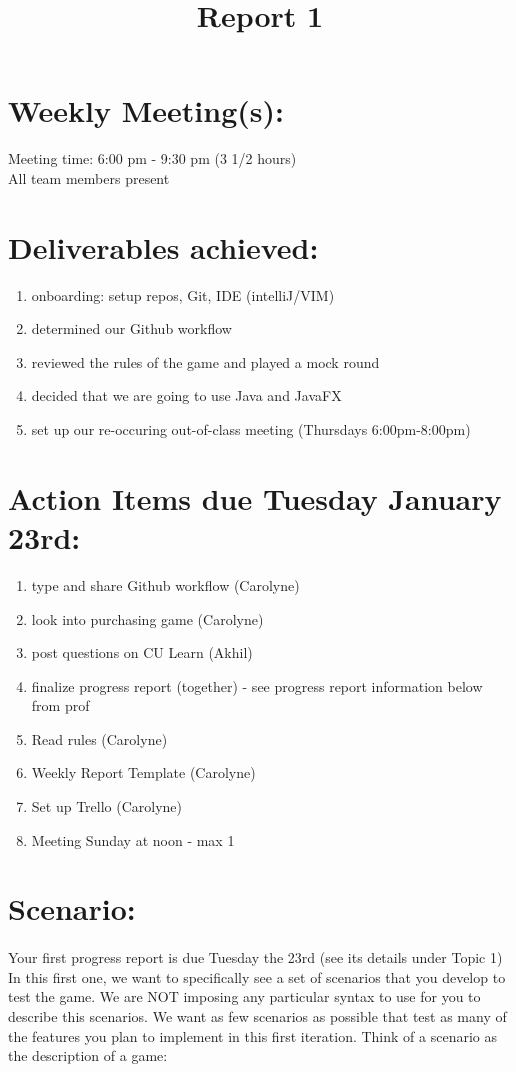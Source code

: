 \documentclass[a4paper,11pt]{report}
\title{Report 1}
\begin{document}
\section{Weekly Meeting(s):}
Meeting time: 6:00 pm - 9:30 pm (3 1/2 hours)\\
All team members present

\section{Deliverables achieved:}
\begin{enumerate}
\item	onboarding: setup repos, Git, IDE (intelliJ/VIM)
\item determined our Github workflow
\item reviewed the rules of the game and played a mock round
\item decided that we are going to use Java and JavaFX
\item set up our re-occuring out-of-class meeting (Thursdays 6:00pm-8:00pm)
\end{enumerate}

\section{Action Items due Tuesday January 23rd:}
\begin{enumerate}
\item type and share Github workflow (Carolyne)
\item look into purchasing game (Carolyne)
\item post questions on CU Learn (Akhil)
\item finalize progress report (together) - see progress report information below from prof
\item Read rules (Carolyne)
\item Weekly Report Template (Carolyne)
\item Set up Trello (Carolyne)
\item Meeting Sunday at noon - max 1

\end{enumerate}

\section{Scenario:}
\paragraph{}
Your first progress report is due Tuesday the 23rd (see its details under Topic 1)
In this first one, we want to specifically see a set of scenarios that you develop to test the game.
We are NOT imposing any particular syntax to use for you to describe this scenarios.
We want as few scenarios as possible that test as many of the features you plan to implement in this first iteration.
Think of a scenario as the description of a game:
\end{document}
